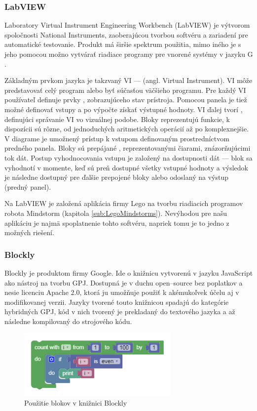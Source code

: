 \subsubsection{LabVIEW}
Laboratory Virtual Instrument Engineering Workbench (LabVIEW) je výtvorom spoločnosti National Instruments, zaoberajúcou tvorbou softvéru a zariadení pre automatické testovanie. Produkt má širšie spektrum použitia, mimo iného je s jeho pomocou možno vytvárať riadiace programy pre vnorené systémy v jazyku G \cite{LabVIEW}.

Základným prvkom jazyka je takzvaný VI ---  (angl. Virtual Instrument). VI môže predstavovať celý program alebo byť súčasťou väčšieho programu. Pre každý VI používateľ definuje prvky , zobrazujúceho stav prístroja. Pomocou panela je tiež možné definovať vstupy a po výpočte získať výstupné hodnoty. VI ďalej tvorí , definujúci správanie VI vo vizuálnej podobe. Bloky reprezentujú funkcie, k dispozícii sú rôzne, od jednoduchých aritmetických operácií až po komplexnejšie. V diagrame je umožnený prístup k vstupom definovaným prostredníctvom predného panela. Bloky sú prepájané , reprezentovanými čiarami, znázorňujúcimi tok dát. Postup vyhodnocovania vstupu je založený na dostupnosti dát --- blok sa vyhodnotí v momente, keď sú preň dostupné všetky vstupné hodnoty a výsledok je následne dostupný pre ďalšie prepojené bloky alebo odoslaný na výstup (predný panel).

Na LabVIEW je založená aplikácia firmy Lego na tvorbu riadiacich programov robota Mindstorm (kapitola \ref{sub:LegoMindstorms}). Nevýhodou pre našu aplikáciu je najmä spoplatnenie tohto softvéru, napriek tomu je to jedno z možných riešení.

\subsubsection{Blockly}
Blockly je produktom firmy Google. Ide o knižnicu vytvorenú v jazyku JavaScript ako nástroj na tvorbu GPJ. Dostupná je v duchu open--source bez poplatkov a nesie licenciu Apache 2.0, ktorá ju umožňuje použiť k akémukoľvek účelu aj v modifikovanej verzii. Jazyky tvorené touto knižnicou spadajú do kategórie hybridných GPJ, kód v nich tvorený je prekladaný do textového jazyka a až následne kompilovaný do strojového kódu.

\begin{figure}
\centerline{\includegraphics[width=0.7\textwidth]{images/blocky-example}}
\caption[Použitie blokov v knižnici Blockly]{Použitie blokov v knižnici Blockly}
\label{obr:blockly-example}
\end{figure}

